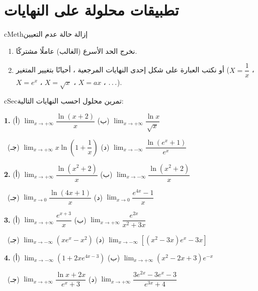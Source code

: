 \documentclass[12pt,a4paper]{article}
\newenvironment{BOX}[2]{\begin{otherlanguage}{english}\begin{arbox}{#1}{#2}}{\end{arbox}\end{otherlanguage}}
\newenvironment{tariqa}[1][طريقة]{\begin{BOX}{cMeth}{#1}}{\end{BOX}}
\newcounter{exo}
\renewcommand{\ldots}{\mathinner{\ldotp\ldotp\ldotp}}
\newcommand{\QQ}[1]{\par\smallskip\textbf{#1.} }
\newenvironment{tmr}{\stepcounter{exo}\begin{BOX}{cSec}{تمرين محلول \theexo}}{\end{BOX}}
\newcommand{\Lm}[1]{\displaystyle\lim_{x\to#1}}
\begin{document}
\section{تطبيقات محلولة على النهايات}
\begin{tariqa}[إزالة حالة عدم التعيين]
\begin{enumerate}
\item نخرج الحد الأسرع (الغالب) عاملًا مشتركًا.
\item أو نكتب العبارة على شكل إحدى النهايات المرجعية ، أحيانًا بتغيير المتغير ($X=\dfrac1x$ ، $X=e^x$ ، $X=\sqrt x$ ، $X=ax$ ، $\ldots$).
\end{enumerate}
\end{tariqa}

\begin{tmr}
احسب النهايات التالية:
\QQ{1} (أ) $\Lm{+\infty}\dfrac{\ln(x+2)}x$ \qquad (ب) $\Lm{+\infty}\dfrac{\ln x}{\sqrt x}$\par \qquad\ (جـ) $\Lm{+\infty}x\ln\left(1+\dfrac1x\right)$ \qquad (د) $\Lm{-\infty}\dfrac{\ln\left(e^x+1\right)}{e^x}$
\QQ{2} (أ) $\Lm{+\infty}\dfrac{\ln\left(x^2+2\right)}x$ \qquad (ب) $\Lm{-\infty}\dfrac{\ln\left(x^2+2\right)}x$\par \qquad\ (جـ) $\Lm{0}\dfrac{\ln(4x+1)}x$ \qquad (د) $\Lm{0}\dfrac{e^{4x}-1}x$
\QQ{3} (أ) $\Lm{+\infty}\dfrac{e^{x+3}}x$ \qquad (ب) $\Lm{+\infty}\dfrac{e^{2x}}{x^2+3x}$\par \qquad\ (جـ) $\Lm{-\infty}\left(xe^x-x^2\right)$ \qquad (د) $\Lm{-\infty}\left[\left(x^2-3x\right)e^x-3x\right]$
\QQ{4} (أ) $\Lm{-\infty}\left(1+2xe^{4x-3}\right)$ \qquad (ب) $\Lm{+\infty}\left(x^2-2x+3\right)e^{-x}$\par \qquad\ (جـ) $\Lm{+\infty}\dfrac{\ln x+2x}{e^x+3}$ \qquad (د) $\Lm{+\infty}\dfrac{3e^{2x}-3e^x-3}{e^{3x}+4}$
\end{tmr}
\end{document}
